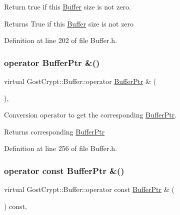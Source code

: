 Return true if this \hyperlink{class_gost_crypt_1_1_buffer}{Buffer} size is not zero. 

\begin{DoxyReturn}{Returns}
True if this \hyperlink{class_gost_crypt_1_1_buffer}{Buffer} size is not zero 
\end{DoxyReturn}


Definition at line 202 of file Buffer.\+h.

\mbox{\label{class_gost_crypt_1_1_buffer_a440928271a80ac5014ba240e6595ff85}} 
\subsubsection{\texorpdfstring{operator Buffer\+Ptr \&()}{operator BufferPtr \&()}}
{\footnotesize\ttfamily virtual Gost\+Crypt\+::\+Buffer\+::operator \hyperlink{class_gost_crypt_1_1_buffer_ptr}{Buffer\+Ptr} \& (\begin{DoxyParamCaption}{ }\end{DoxyParamCaption})\hspace{0.3cm}{\ttfamily [inline]}, {\ttfamily [virtual]}}



Conversion operator to get the corresponding \hyperlink{class_gost_crypt_1_1_buffer_ptr}{Buffer\+Ptr}. 

\begin{DoxyReturn}{Returns}
corresponding \hyperlink{class_gost_crypt_1_1_buffer_ptr}{Buffer\+Ptr} 
\end{DoxyReturn}


Definition at line 256 of file Buffer.\+h.

\mbox{\label{class_gost_crypt_1_1_buffer_a493a94d9ba6761d823e6e2f61c052226}} 
\subsubsection{\texorpdfstring{operator const Buffer\+Ptr \&()}{operator const BufferPtr \&()}}
{\footnotesize\ttfamily virtual Gost\+Crypt\+::\+Buffer\+::operator const \hyperlink{class_gost_crypt_1_1_buffer_ptr}{Buffer\+Ptr} \& (\begin{DoxyParamCaption}{ }\end{DoxyParamCaption}) const\hspace{0.3cm}{\ttfamily [inline]}, {\ttfamily [virtual]}}



